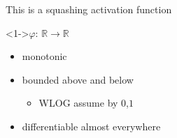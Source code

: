 \documentclass[dvipsnames,handout]{beamer}
\newcommand{\R}{\mathbb{R}}
\renewcommand{\v}{\varphi}
\begin{document}
\begin{frame}{This is a squashing activation function}
	\begin{block}<1->{$\v:\,\R \to \R$}
		\begin{itemize}
			\item monotonic
			\item bounded above and below
			\begin{itemize}
				\item WLOG assume by $0$,$1$
			\end{itemize}
			\item differentiable almost everywhere 
		\end{itemize}
	\end{block}
	\vfill
	
	\begin{columns}[onlytextwidth]
		\begin{column}{0.33\textwidth}
			\centering
		\end{column}
	

		\begin{column}{0.33\textwidth}
			\centering
		\end{column}
	
		
		\begin{column}{0.33\textwidth}
			\centering
		\end{column}	
	\end{columns}

\end{frame}
\end{document}
